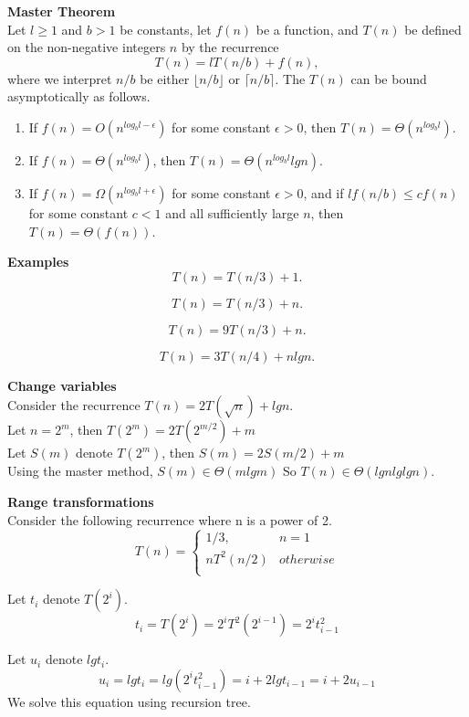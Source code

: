 \documentclass{seminar}
\begin{document}
\begin{slide}
{\bf Master Theorem} \\
Let $l \ge 1$ and $b>1$ be constants, let $f(n)$ be a function, and $T(n)$ be
defined on the non-negative integers $n$ by the recurrence
$$T(n) = lT(n/b)+f(n),$$
where we interpret $n/b$ be either $\lfloor n/b \rfloor$ or $\lceil n/b
\rceil$. The $T(n)$ can be bound asymptotically as follows.

\begin{enumerate}
\item If $f(n) = O(n^{log_{b}{l} - \epsilon})$ for some constant $\epsilon > 0$,
  then $T(n) = \Theta(n^{log_{b}{l}})$.

\item If $f(n) = \Theta(n^{log_{b}{l}})$,
  then $T(n) = \Theta(n^{log_{b}{l}} lg n)$.

\item If $f(n) = \Omega(n^{log_{b}{l}  + \epsilon})$ for some constant $\epsilon > 0$,
and if $lf(n/b) \le cf(n)$ for some constant $c < 1$ and all sufficiently
large $n$, then $T(n) = \Theta(f(n))$.
\end{enumerate}
\end{slide}

\begin{slide}
{\bf Examples}
$$T(n) = T(n/3)+1.$$

$$T(n) = T(n/3)+n. $$

$$T(n) = 9T(n/3)+n.$$

$$T(n) = 3T(n/4) + nlg n.$$
\end{slide} 

\begin{slide}
{\bf Change variables}\\
Consider the recurrence $T(n)=2T(\sqrt{n})+ lgn$. \\
Let $ n =2^m$, then $T(2^m) = 2T(2^{m/2})+m$ \\
Let $S(m)$ denote $T(2^m)$, then $S(m) = 2 S(m/2) + m$\\

Using the master method, $S(m) \in \Theta(m lg m)$
So $T(n) \in \Theta(lg n lg lg n) $.
\end{slide}

\begin{slide}
{\bf Range transformations} \\
Consider the following recurrence where n is a power of 2.
\[
T(n) = \left\{
 \begin{array}{ll}
       1/3, & n=1 \\
       nT^2(n/2) & otherwise \\
 \end{array}
 \right.
\] 

Let $t_i$ denote $T(2^i)$.
$$t_i=T(2^i)=2^iT^2(2^{i-1})=2^it^2_{i-1}$$

Let $u_i$ denote $lg t_i$.
$$u_i = lg t_i = lg(2^it^2_{i-1}) = i + 2 lgt_{i-1} = i+ 2u_{i-1}$$
We solve this equation using recursion tree.
\end{slide}
\end{document}
